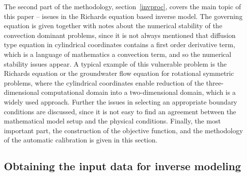 \documentclass[review]{myarticle}
\begin{document}
The second part of the methodology, section~\ref{invproc}, covers the main topic of this paper --  issues in the Richards equation based inverse model. The governing equation is given together with  notes about the numerical stability of the convection dominant problems, since it is not always mentioned that diffusion type equation in cylindrical coordinates  contains a first order derivative term, which is a language of mathematics  a convection term, and so the numerical stability issues appear. A typical example of this vulnerable problem is the Richards equation or the groundwater flow equation for rotational symmetric problems, where the cylindrical coordinates enable reduction of the three-dimensional computational domain into a two-dimensional domain, which is a widely used approach.
Further the issues in selecting an appropriate boundary conditions are discussed, since it is not easy to find an agreement between the mathematical model setup and the physical conditions. Finally, the most important part, the construction of the objective function, and the methodology of the automatic calibration is given in this section. 



\subsection{Obtaining the input data for inverse modeling}
\label{assamb}
\end{document}
